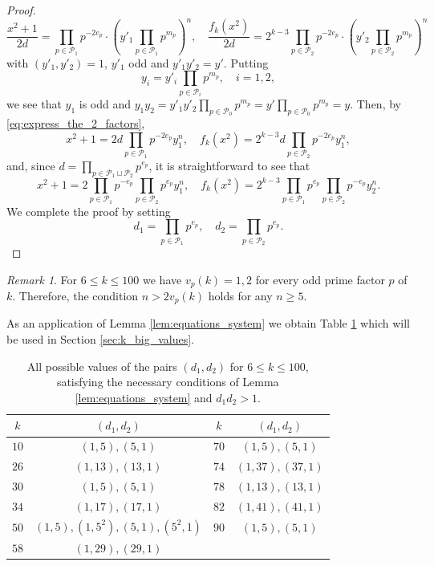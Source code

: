 \documentclass[12pt]{amsart}
\numberwithin{equation}{section}
\theoremstyle{definition}
\theoremstyle{remark}
\newtheorem{remark}[lemma]{Remark}
\newcommand{\cP}{\mathcal{P}}
\begin{document}
\begin{proof}
\begin{equation}  \label{eq:express_the_2_factors}
\frac{x^2+1}{2d}=
\prod_{p\in \cP_1}p^{-2e_p}\cdot
\left(y'_1\prod_{p\in \cP_1}p^{m_p}\right)^n,
\quad
 \frac{f_k(x^2)}{2d} = 2^{k-3}
    \prod_{p\in \cP_2}p^{-2e_p}\cdot
    \left(y'_2\prod_{p\in \cP_2}p^{m_p}\right)^n
\end{equation}
%
with $(y'_1,y'_2)=1$, $y'_1$ odd and $y'_1y'_2=y'$.
Putting
%
\begin{equation*}
    y_i = y'_i\prod_{p\in \cP_i}p^{m_p},\quad i=1,2,
\end{equation*}
%
we see that $y_1$ is odd and
$y_1y_2=y'_1y'_2\prod_{p\in \cP_0}p^{m_p}=y'\prod_{p\in \cP_0}p^{m_p}=y$.
Then, by \eqref{eq:express_the_2_factors},
\begin{equation*}
x^2+1=2d\prod_{p\in\cP_1}p^{-2e_p}y_1^n,\quad
f_k(x^2)=2^{k-3}d\prod_{p\in\cP_2}p^{-2e_p}y_1^n,
\end{equation*}
and, since $d=\prod_{p\in\cP_1\sqcup\cP_2}p^{e_p}$, it is 
straightforward to see that
\begin{equation*}
x^2+1=2\prod_{p\in\cP_1}p^{-e_p}\prod_{p\in\cP_2}p^{e_p}y_1^n,
\quad
f_k(x^2)= 2^{k-3}\prod_{p\in\cP_1}p^{e_p}\prod_{p\in\cP_2}p^{-e_p}y_2^n.
\end{equation*}
We complete the proof by setting 
\begin{equation*}
d_1= \prod_{p\in\cP_1}p^{e_p},\quad d_2 = \prod_{p\in\cP_2}p^{e_p}.
\end{equation*}
\end{proof}
%
\begin{remark} \label{rem:n>2v_p(k)}
For $6\leq k\leq 100$ we have $v_p(k)=1,2$ for every odd prime factor $p$ of $k$. Therefore, the condition $n>2v_p(k)$ holds for any $n \geq 5$.
\end{remark}
%
As an application of Lemma \ref{lem:equations_system} we obtain Table \ref{table:d1_d2_values} which will be used in Section \ref{sec:k_big_values}.
\begin{table}[h]
    \centering
    \begin{tabular}{| c | c || c | c | }
        \hline
        $k$ &  $(d_1, d_2)$ & $k$ & $(d_1, d_2)$\\
        \hline
        $10$ & $(1, 5), (5, 1)$ & $70$ &  $(1, 5), (5, 1)$  \\ 
        \hline 
        $26$ &  $(1, 13), (13, 1)$ & $74$ &  $(1,37), (37, 1)$ \\
        \hline
        $30$ &  $(1, 5), (5, 1)$ & $78$ & $(1, 13), (13, 1)$\\
        \hline
        $34$ &  $(1, 17), (17, 1)$ & $82$ & $(1, 41), (41, 1)$\\
        \hline
        $50$ &  $(1, 5), (1, 5^2), (5, 1), (5^2, 1)$ 
        & $90$ & $(1, 5), (5, 1)$\\
        \hline
         $58$ &  $(1, 29), (29, 1)$ &  & \\
         \hline
    \end{tabular}
    \caption{All possible values of the pairs $(d_1,d_2)$ for $6\leq k\leq 100$, satisfying the necessary conditions of Lemma \ref{lem:equations_system} and $d_1d_2>1$.} \label{table:d1_d2_values}
\end{table}
%
\end{document}
